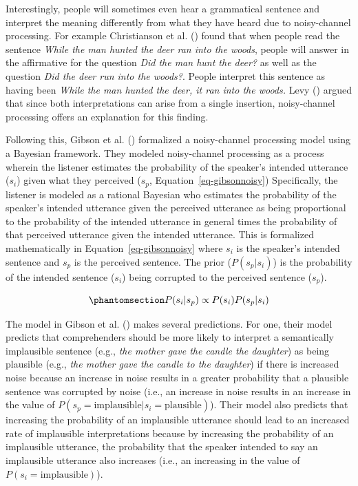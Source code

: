 \documentclass[
  12pt,
]{scrartcl}
\begin{document}
Interestingly, people will sometimes even hear a grammatical sentence
and interpret the meaning differently from what they have heard due to
noisy-channel processing. For example Christianson et al.
() found that
when people read the sentence \emph{While the man hunted the deer ran
into the woods}, people will answer in the affirmative for the question
\emph{Did the man hunt the deer?} as well as the question \emph{Did the
deer run into the woods?}. People interpret this sentence as having been
\emph{While the man hunted the deer, it ran into the woods.} Levy
() argued that since
both interpretations can arise from a single insertion, noisy-channel
processing offers an explanation for this finding.

Following this, Gibson et al.
()
formalized a noisy-channel processing model using a Bayesian framework.
They modeled noisy-channel processing as a process wherein the listener
estimates the probability of the speaker's intended utterance (\(s_i\))
given what they perceived (\(s_p\), Equation~\ref{eq-gibsonnoisy})
Specifically, the listener is modeled as a rational Bayesian who
estimates the probability of the speaker's intended utterance given the
perceived utterance as being proportional to the probability of the
intended utterance in general times the probability of that perceived
utterance given the intended utterance. This is formalized
mathematically in Equation~\ref{eq-gibsonnoisy} where \(s_i\) is the
speaker's intended sentence and \(s_p\) is the perceived sentence. The
prior (\(P(s_p|s_i)\)) is the probability of the intended sentence
(\(s_i\)) being corrupted to the perceived sentence (\(s_p\)).

\begin{equation}\phantomsection\label{eq-gibsonnoisy}{
P(s_i|s_p)\propto P(s_i) P(s_p|s_i) 
}\end{equation}

The model in Gibson et al.
()
makes several predictions. For one, their model predicts that
comprehenders should be more likely to interpret a semantically
implausible sentence (e.g., \emph{the mother gave the candle the
daughter}) as being plausible (e.g., \emph{the mother gave the candle to
the daughter}) if there is increased noise because an increase in noise
results in a greater probability that a plausible sentence was corrupted
by noise (i.e., an increase in noise results in an increase in the value
of \(P(s_p=\text{implausible}|s_i=\text{plausible})\)). Their model also
predicts that increasing the probability of an implausible utterance
should lead to an increased rate of implausible interpretations because
by increasing the probability of an implausible utterance, the
probability that the speaker intended to say an implausible utterance
also increases (i.e., an increasing in the value of
\(P(s_i=\text{implausible})\)).
\end{document}

